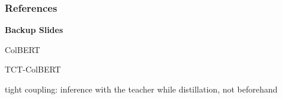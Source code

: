 \documentclass[aspectratio=169]{beamer}
\begin{document}
\begin{frame}[allowframebreaks]
    \frametitle{References}
    
    
\end{frame}

\begin{frame}{}
    \textbf{Backup Slides}
\end{frame}

\begin{frame}{ColBERT \cite{colbert}}
    \begin{figure}[!ht]
        \centering
    \end{figure}
\end{frame}

\begin{frame}{TCT-ColBERT \cite{tct_colbert,tct_colbert2}}
    \begin{figure}[!ht]
        \centering
    \end{figure}
    tight coupling: inference with the teacher while distillation, not beforehand
\end{frame}
\end{document}
